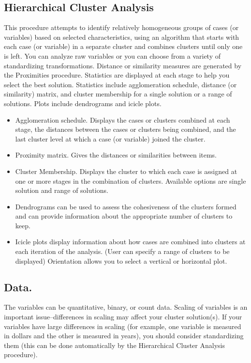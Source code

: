 \documentclass[a4paper,12pt]{article}
\begin{document}
\subsection*{Hierarchical Cluster Analysis}
This procedure attempts to identify relatively homogeneous groups of cases (or variables) based on selected characteristics, using an algorithm that starts with each case (or variable) in a separate cluster and combines clusters until only one is left. You can analyze raw variables or you can choose from a variety of standardizing transformations. Distance or similarity measures are generated by the Proximities procedure. Statistics are displayed at each stage to help you select the best solution.  Statistics include agglomeration schedule, distance (or similarity) matrix, and cluster membership for a single solution or a range of solutions.  Plots include dendrograms and icicle plots.
\begin{itemize}
	\item 	Agglomeration schedule. Displays the cases or clusters combined at each stage, the distances between the cases or clusters being combined, and the last cluster level at which a case (or variable) joined the cluster.
	\item 	Proximity matrix. Gives the distances or similarities between items.
	\item 	Cluster Membership. Displays the cluster to which each case is assigned at one or more stages in the combination of clusters. Available options are single solution and range of solutions.
	\item 	Dendrograms can be used to assess the cohesiveness of the clusters formed and can provide information about the appropriate number of clusters to keep.
	\item 	Icicle plots display information about how cases are combined into clusters at each iteration of the analysis. (User can specify a range of clusters to be displayed) Orientation allows you to select a vertical or horizontal plot.
\end{itemize}

\subsection*{Data.}  The variables can be quantitative, binary, or count data. Scaling of variables is an important issue--differences in scaling may affect your cluster solution(s). If your variables have large differences in scaling (for example, one variable is measured in dollars and the other is measured in years), you should consider standardizing them (this can be done automatically by the Hierarchical Cluster Analysis procedure).
\end{document}
